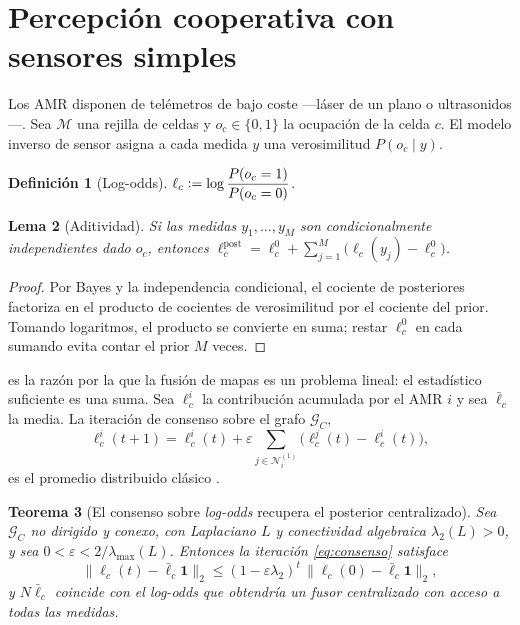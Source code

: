 \documentclass[11pt,a4paper]{article}
\theoremstyle{plain}
\newtheorem{teorema}{Teorema}[section]
\newtheorem{lema}[teorema]{Lema}
\theoremstyle{definition}
\newtheorem{definicion}[teorema]{Definición}
\theoremstyle{remark}
\newcommand{\Ncal}{\mathcal{N}}
\newcommand{\Gcal}{\mathcal{G}}
\newcommand{\Mcal}{\mathcal{M}}
\newcommand{\defeq}{\vcentcolon=}
\begin{document}
\section{Percepción cooperativa con sensores simples}
\label{sec:percepcion}

Los AMR disponen de telémetros de bajo coste —láser de un plano o
ultrasonidos—. Sea $\Mcal$ una rejilla de celdas y $o_c\in\{0,1\}$ la ocupación
de la celda $c$. El modelo inverso de sensor asigna a cada medida $y$ una
verosimilitud $P(o_c\mid y)$.

\begin{definicion}[Log-odds]
$\ell_c \defeq \log\dfrac{P(o_c=1)}{P(o_c=0)}$.
\end{definicion}

\begin{lema}[Aditividad]
\label{le:aditividad}
Si las medidas $y_1,\dots,y_M$ son condicionalmente independientes dado $o_c$,
entonces
$\ell_c^{\mathrm{post}}=\ell_c^{0}+\sum_{j=1}^{M}\big(\ell_c(y_j)-\ell_c^{0}\big)$.
\end{lema}

\begin{proof}
Por Bayes y la independencia condicional, el cociente de posteriores factoriza
en el producto de cocientes de verosimilitud por el cociente del prior.
Tomando logaritmos, el producto se convierte en suma; restar $\ell_c^0$ en cada
sumando evita contar el prior $M$ veces.
\end{proof}

 es la razón por la que la fusión de mapas es un problema
lineal: el estadístico suficiente es una suma. Sea $\ell_c^{i}$ la contribución
acumulada por el AMR $i$ y sea $\bar\ell_c$ la media. La iteración de consenso
sobre el grafo $\Gcal_C$,
\begin{equation}
  \ell_c^{i}(t+1)=\ell_c^{i}(t)
  +\varepsilon\!\!\sum_{j\in\Ncal_i^{(1)}}\!\!\big(\ell_c^{j}(t)-\ell_c^{i}(t)\big),
  \label{eq:consenso}
\end{equation}
es el promedio distribuido clásico \cite{olfatiSaber2004consensus,bullo2009distributed}.

\begin{teorema}[El consenso sobre \emph{log-odds} recupera el posterior centralizado]
\label{th:mapa}
Sea $\Gcal_C$ no dirigido y conexo, con Laplaciano $L$ y conectividad algebraica
$\lambda_2(L)>0$, y sea $0<\varepsilon<2/\lambda_{\max}(L)$. Entonces la
iteración \eqref{eq:consenso} satisface
\[
  \big\|\bm\ell_c(t)-\bar\ell_c\mathbf 1\big\|_2
  \le (1-\varepsilon\lambda_2)^{t}\,
      \big\|\bm\ell_c(0)-\bar\ell_c\mathbf 1\big\|_2 ,
\]
y $N\bar\ell_c$ coincide con el \emph{log-odds} que obtendría un fusor
centralizado con acceso a todas las medidas.
\end{teorema}
\end{document}
